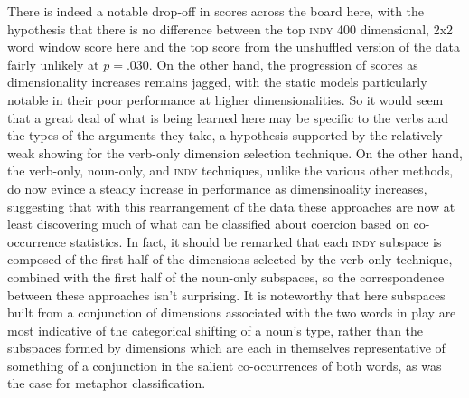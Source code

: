 There is indeed a notable drop-off in scores across the board here, with the hypothesis that there is no difference between the top \textsc{indy} 400 dimensional, 2x2 word window score here and the top score from the unshuffled version of the data fairly unlikely at $p = .030$.  On the other hand, the progression of scores as dimensionality increases remains jagged, with the static models particularly notable in their poor performance at higher dimensionalities.  So it would seem that a great deal of what is being learned here may be specific to the verbs and the types of the arguments they take, a hypothesis supported by the relatively weak showing for the verb-only dimension selection technique.  On the other hand, the verb-only, noun-only, and \textsc{indy} techniques, unlike the various other methods, do now evince a steady increase in performance as dimensinoality increases, suggesting that with this rearrangement of the data these approaches are now at least discovering much of what can be classified about coercion based on co-occurrence statistics.  In fact, it should be remarked that each \textsc{indy} subspace is composed of the first half of the dimensions selected by the verb-only technique, combined with the first half of the noun-only subspaces, so the correspondence between these approaches isn't surprising.  It is noteworthy that here subspaces built from a conjunction of dimensions associated with the two words in play are most indicative of the categorical shifting of a noun's type, rather than the subspaces formed by dimensions which are each in themselves representative of something of a conjunction in the salient co-occurrences of both words, as was the case for metaphor classification.

